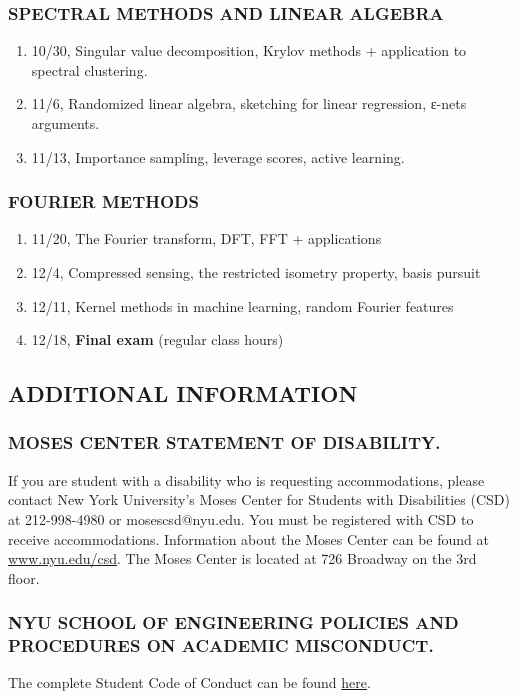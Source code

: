 \documentclass[10pt]{article}
\begin{document}
\subsubsection{SPECTRAL METHODS AND LINEAR ALGEBRA}
\begin{enumerate}\itemsep0em 
\setcounter{enumi}{8}
\item 10/30, Singular value decomposition, Krylov methods + application to spectral clustering.		
\item  11/6, Randomized linear algebra, sketching for linear regression, ε-nets arguments.
\item 11/13, Importance sampling, leverage scores, active learning.
\end{enumerate}

\subsubsection{FOURIER METHODS}
\begin{enumerate}\itemsep0em 
	\setcounter{enumi}{11}
	\item 11/20, The Fourier transform, DFT, FFT + applications
	\item 12/4, Compressed sensing, the restricted isometry property, basis pursuit		
	\item 12/11, Kernel methods in machine learning, random Fourier features
	\item 12/18, \textbf{Final exam} (regular class hours)	
\end{enumerate}

\subsection{ADDITIONAL INFORMATION}

\subsubsection{MOSES CENTER STATEMENT OF DISABILITY.}

If you are student with a disability who is requesting accommodations, please contact New York University’s Moses Center for Students with Disabilities (CSD) at 212-998-4980 or mosescsd@nyu.edu.  You must be registered with CSD to receive accommodations.  Information about the Moses Center can be found at \url{www.nyu.edu/csd}. The Moses Center is located at 726 Broadway on the 3rd floor.

\subsubsection{NYU SCHOOL OF ENGINEERING POLICIES AND PROCEDURES ON ACADEMIC MISCONDUCT.}
The complete Student Code of Conduct can be found \href{https://engineering.nyu.edu/campus-and-community/student-life/office-student-affairs/policies/student-code-conduct}{here}.
\end{document}
